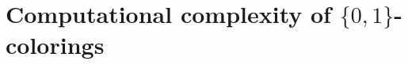 \documentclass[twocolumn, a4paper, superscriptaddress,nofootinbib, accepted=2020-08-07, hyperref]{quantumarticle}
\newtheorem{prop}{Proposition}
\begin{document}
%
%
%
%
%
%

\section{Computational complexity of $\{0,1\}$-colorings}\label{sec:compl}
\label{sec:Comp-complexity}
\end{document}

